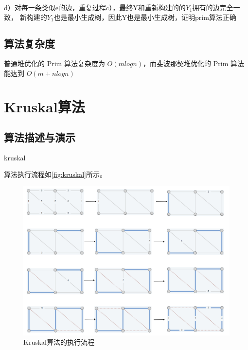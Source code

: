 d）对每一条类似e的边，重复过程c），最终Y和重新构建的的$Y_1$拥有的边完全一致，
新构建的$Y_1$也是最小生成树，因此Y也是最小生成树，证明prim算法正确

\subsection{算法复杂度}
普通堆优化的 Prim 算法复杂度为 $O(mlogn)$，而斐波那契堆优化的 Prim 算法
能达到 $O(m+nlogn)$

\section{Kruskal算法}\label{sec:kruskal}
\subsection{算法描述与演示}
\begin{algorithm}
	\DontPrintSemicolon
	\caption{kruskal}\label{alg:kruskal}
\end{algorithm}

算法执行流程如\autoref{fig:kruskal}所示。

\begin{figure}[hbt]
	\centering
	\includegraphics[scale=0.5]{image/kruskal.png}
	\caption{Kruskal算法的执行流程}\label{fig:kruskal}
\end{figure}

